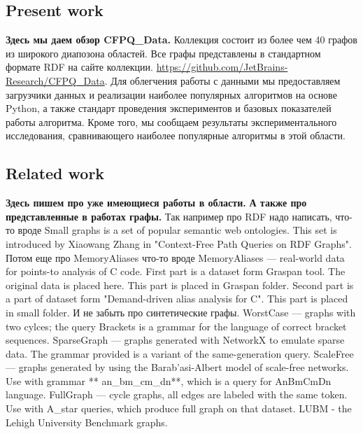 \subsection{Present work}
\textbf{Здесь мы даем обзор CFPQ\_Data.}
Коллекция состоит из более чем 40 графов из широкого диапозона областей.
Все графы представлены в стандартном формате RDF на сайте коллекции. \href{https://github.com/JetBrains-Research/CFPQ_Data}{https://github.com/JetBrains-Research/CFPQ\_Data}.
Для облегчения работы с данными мы предоставляем загрузчики данных и реализации наиболее популярных алгоритмов на основе Python, а также стандарт проведения экспериментов и базовых показателей работы алгоритма.
Кроме того, мы сообщаем результаты экспериментального исследования, сравнивающего наиболее популярные алгоритмы в этой области.

\subsection{Related work}
\textbf{Здесь пишем про уже имеющиеся работы в области.}
\textbf{А также про представленные в работах графы.}
Так например про RDF надо написать, что-то вроде Small graphs is a set of popular semantic web ontologies. This set is introduced by Xiaowang Zhang in "Context-Free Path Queries on RDF Graphs".
Потом еще про MemoryAliases что-то вроде MemoryAliases — real-world data for points-to analysis of C code.
First part is a dataset form Graspan tool. The original data is placed here. This part is placed in Graspan folder.
Second part is a part of dataset form "Demand-driven alias analysis for C". This part is placed in small folder.
И не забыть про синтетические графы.
WorstCase — graphs with two cylces; the query Brackets is a grammar for the language of correct bracket sequences.
SparseGraph — graphs generated with NetworkX to emulate sparse data. The grammar provided is a variant of the same-generation query.
ScaleFree — graphs generated by using the Barab'asi-Albert model of scale-free networks. Use with grammar ** an\_bm\_cm\_dn**, which is a query for AnBmCmDn language.
FullGraph — cycle graphs, all edges are labeled with the same token. Use with A\_star queries, which produce full graph on that dataset.
LUBM - the Lehigh University Benchmark graphs.